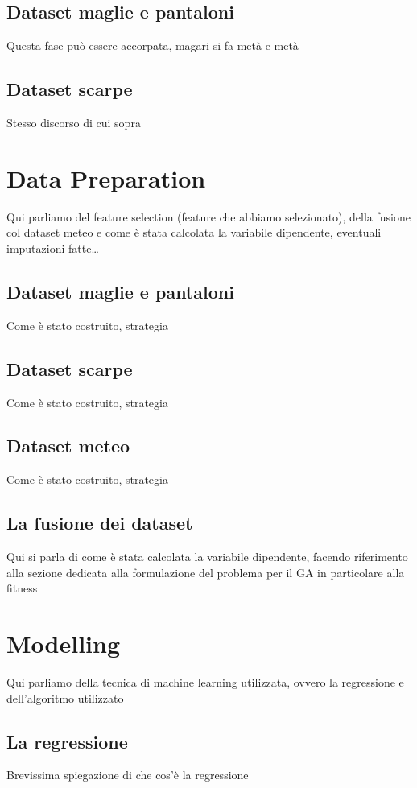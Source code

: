 \documentclass[a4paper, 11pt, oneside]{report}
\begin{document}
                \subsection{Dataset maglie e pantaloni}
                Questa fase può essere accorpata, magari si fa metà e metà
                \subsection{Dataset scarpe}
                Stesso discorso di cui sopra

            \section{Data Preparation}
            Qui parliamo del feature selection (feature che abbiamo selezionato), della fusione col dataset meteo e come
            è stata calcolata la variabile dipendente, eventuali imputazioni fatte\ldots
                \subsection{Dataset maglie e pantaloni}
                Come è stato costruito, strategia
                \subsection{Dataset scarpe}
                Come è stato costruito, strategia
                \subsection{Dataset meteo}
                Come è stato costruito, strategia
                \subsection{La fusione dei dataset}
                Qui si parla di come è stata calcolata la variabile dipendente, facendo riferimento alla sezione dedicata
                alla formulazione del problema per il GA in particolare alla fitness

            \section{Modelling}
            Qui parliamo della tecnica di machine learning utilizzata, ovvero la regressione e dell'algoritmo utilizzato
                \subsection{La regressione}
                Brevissima spiegazione di che cos'è la regressione
\end{document}
